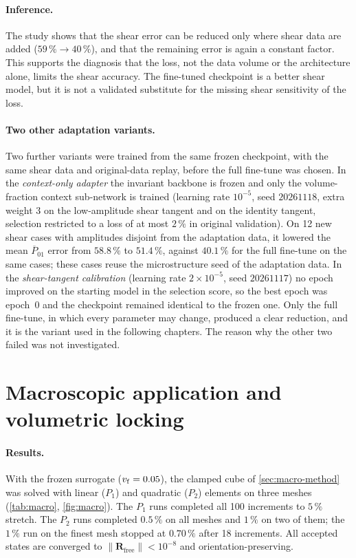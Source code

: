 \paragraph{Inference.} The study shows that the shear error can be reduced only where shear data are added
($59\,\%\to40\,\%$), and that the remaining error is again a constant factor. This supports the
diagnosis that the loss, not the data volume or the architecture alone, limits the shear
accuracy. The fine-tuned checkpoint is a better shear model, but it is not a validated
substitute for the missing shear sensitivity of the loss.

\paragraph{Two other adaptation variants.}\label{sec:shearvariants}
Two further variants were trained from the same frozen checkpoint, with the same shear
data and original-data replay, before the full fine-tune was chosen. In the
\emph{context-only adapter} the invariant backbone is frozen and only the volume-fraction
context sub-network is trained (learning rate $10^{-5}$, seed $20261118$, extra weight $3$
on the low-amplitude shear tangent and on the identity tangent, selection restricted to a
loss of at most $2\,\%$ in original validation). On 12 new shear cases with amplitudes
disjoint from the adaptation data, it lowered the mean $\overline P_{01}$ error from
$58.8\,\%$ to $51.4\,\%$, against $40.1\,\%$ for the full fine-tune on the same cases;
these cases reuse the microstructure seed of the adaptation data. In the
\emph{shear-tangent calibration} (learning rate $2\times10^{-5}$, seed $20261117$) no
epoch improved on the starting model in the selection score, so the best epoch was
epoch~0 and the checkpoint remained identical to the frozen one. Only the full fine-tune, in which every
parameter may change, produced a clear reduction, and it is the variant used in the
following chapters. The reason why the other two failed was not investigated.

\section{Macroscopic application and volumetric locking}\label{sec:macro}

\paragraph{Results.} With the frozen surrogate ($v_{\mathrm f}=0.05$), the clamped cube
of \cref{sec:macro-method} was solved with linear ($P_1$) and quadratic ($P_2$)
elements on three meshes (\cref{tab:macro}, \cref{fig:macro}). The $P_1$ runs
completed all 100 increments to $5\,\%$ stretch. The $P_2$ runs completed $0.5\,\%$ on
all meshes and $1\,\%$ on two of them; the $1\,\%$ run on the finest mesh stopped at
$0.70\,\%$ after 18 increments. All accepted states are converged to
$\|\bm R_\mathrm{free}\|<10^{-8}$ and orientation-preserving.

